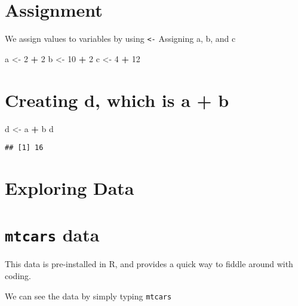 \documentclass[
]{book}
\newenvironment{Shaded}{\begin{snugshade}}{\end{snugshade}}
\newcommand{\DecValTok}[1]{\textcolor[rgb]{0.00,0.00,0.81}{#1}}
\newcommand{\NormalTok}[1]{#1}
\newcommand{\OperatorTok}[1]{\textcolor[rgb]{0.81,0.36,0.00}{\textbf{#1}}}
\newcommand{\StringTok}[1]{\textcolor[rgb]{0.31,0.60,0.02}{#1}}
\begin{document}
\hypertarget{assignment}{%
\section{Assignment}\label{assignment}}

We assign values to variables by using \texttt{\textless{}-}
Assigning a, b, and c

\begin{Shaded}
\begin{Highlighting}[]
\NormalTok{a \textless{}{-}}\StringTok{ }\DecValTok{2} \OperatorTok{+}\StringTok{ }\DecValTok{2}
\NormalTok{b \textless{}{-}}\StringTok{ }\DecValTok{10} \OperatorTok{+}\StringTok{ }\DecValTok{2}
\NormalTok{c \textless{}{-}}\StringTok{ }\DecValTok{4} \OperatorTok{+}\StringTok{ }\DecValTok{12}
\end{Highlighting}
\end{Shaded}

\hypertarget{creating-d-which-is-a-b}{%
\section{Creating d, which is a + b}\label{creating-d-which-is-a-b}}

\begin{Shaded}
\begin{Highlighting}[]
\NormalTok{d \textless{}{-}}\StringTok{ }\NormalTok{a }\OperatorTok{+}\StringTok{ }\NormalTok{b}
\NormalTok{d}
\end{Highlighting}
\end{Shaded}

\begin{verbatim}
## [1] 16
\end{verbatim}

\hypertarget{exploring-data}{%
\section{\texorpdfstring{Exploring Data}{Exploring Data }}\label{exploring-data}}

\hypertarget{mtcars-data}{%
\section{\texorpdfstring{\texttt{mtcars} data}{mtcars data}}\label{mtcars-data}}

This data is pre-installed in R, and provides a quick way to fiddle around
with coding.

We can see the data by simply typing \texttt{mtcars}
\end{document}
